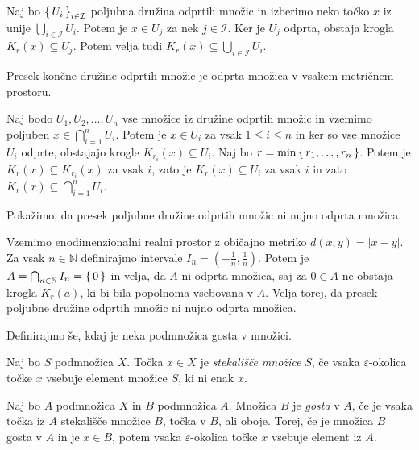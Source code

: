 \documentclass{isrmdelo}
\newcommand{\N}{\mathbb N}
\begin{document}
\begin{dokaz}
Naj bo $\set{U_i}_{i \in \mathcal{I}}$ poljubna družina odprtih množic in izberimo neko točko $x$ iz unije $\bigcup_{i \in \mathcal{I}} U_i$. Potem je $x \in U_j$ za nek $j \in \mathcal{I}$. Ker je $U_j$ odprta, obstaja krogla $K_r(x) \subseteq U_j$. Potem velja tudi $K_r(x) \subseteq \bigcup_{i \in \mathcal{I}} U_i$. \qedhere
\end{dokaz}

\begin{trditev}
\label{trditev:metrika_presek}
Presek končne družine odprtih množic je odprta množica v vsakem metričnem prostoru.
\end{trditev}

\begin{dokaz}
Naj bodo $U_1, U_2, \dots, U_n$ vse množice iz družine odprtih množic in vzemimo poljuben $x \in \bigcap_{i=1}^{n} U_i$. Potem je $x \in U_i$ za vsak $1 \leq i \leq n$ in ker so vse množice $U_i$ odprte, obstajajo krogle $K_{r_i}(x) \subseteq U_i$. Naj bo $r = \min \set{r_1, \dots, r_n}$. Potem je $K_r(x) \subseteq K_{r_i}(x)$ za vsak $i$, zato je $K_r(x) \subseteq U_i$ za vsak $i$ in zato $K_r(x) \subseteq \bigcap_{i=1}^{n} U_i$. \qedhere
\end{dokaz}

\medskip

Pokažimo, da presek poljubne družine odprtih množic ni nujno odprta množica.

\begin{zgled}
\label{zgled:neskoncen_presek}
Vzemimo enodimenzionalni realni prostor z običajno metriko $d(x,y) = \vert x-y \vert$. Za vsak $n \in \N$ definirajmo intervale $I_n = (-\frac{1}{n}, \frac{1}{n})$. Potem je $A = \bigcap_{n \in \N} I_n = \set{0}$ in velja, da $A$ ni odprta množica, saj za $0 \in A$ ne obstaja krogla $K_r(a)$, ki bi bila popolnoma vsebovana v $A$. Velja torej, da presek poljubne družine odprtih množic ni nujno odprta množica.
\end{zgled}

\medskip

Definirajmo še, kdaj je neka podmnožica gosta v množici.

\begin{definicija}
Naj bo $S$ podmnožica $X$. Točka $x \in X$ je \emph{stekališče množice} $S$, če vsaka $\varepsilon$-okolica točke $x$ vsebuje element množice $S$, ki ni enak $x$.
\end{definicija}

\begin{definicija}
Naj bo $A$ podmnožica $X$ in $B$ podmnožica $A$. Množica $B$ je \emph{gosta} v $A$, če je vsaka točka iz $A$ stekališče množice $B$, točka v $B$, ali oboje. Torej, če je množica $B$ gosta v $A$ in je $x \in B$, potem vsaka $\varepsilon$-okolica točke $x$ vsebuje element iz $A$.
\end{definicija}
\end{document}

